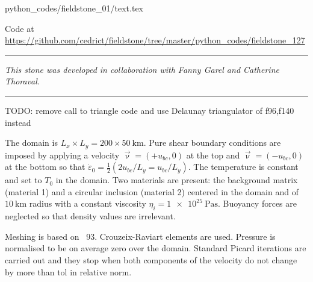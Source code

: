 \begin{flushright} {\tiny {\color{gray} python\_codes/fieldstone\_01/text.tex}} \end{flushright}



\begin{center}
\inpython
Code at \url{https://github.com/cedrict/fieldstone/tree/master/python_codes/fieldstone_127}
\end{center}

\par\noindent\rule{\textwidth}{0.4pt}

{\sl This stone was developed in collaboration with Fanny Garel and Catherine Thoraval}. 

\par\noindent\rule{\textwidth}{0.4pt}


TODO: remove call to triangle code and use Delaunay triangulator of f96,f140 instead


The domain is $L_x \times L_y=200\times 50~\si{\km}$. Pure shear boundary conditions are imposed by 
applying a velocity $\vec\upnu=(+u_{bc},0)$ at the top and $\vec\upnu=(-u_{bc},0)$ at the bottom so 
that $\dot\varepsilon_{0}=\frac12 (2u_{bc}/L_y=u_{bc}/L_y)$.
The temperature is constant and set to $T_0$ in the domain.
Two materials are present: the background matrix (material 1) and a circular inclusion (material 2)
centered in the domain and of $10~\si{\km}$ radius with a constant 
viscosity $\eta_i=\SI{1e25}{\pascal\second}$.
Buoyancy forces are neglected so that density values are irrelevant.

Meshing is based on \stone~93. Crouzeix-Raviart elements are used. Pressure is normalised to be
on average zero over the domain.
Standard Picard iterations are carried out and they stop when both components 
of the velocity do not change by more than {\python tol} in relative norm. 


